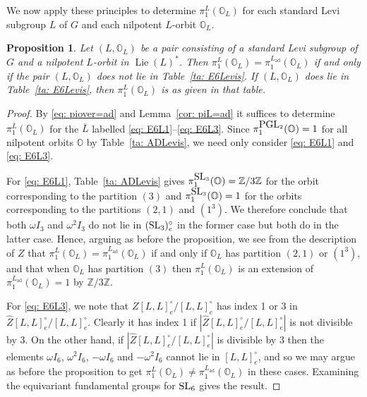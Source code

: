 \documentclass[11pt]{amsart}
\renewcommand{\O}{{\mathbb O}}
\newcommand{\bZ}{{\mathbb Z}}
\newcommand{\ad}{{\operatorname{ad}}}
\newcommand{\Lie}{\operatorname{Lie}}
\newcommand{\SL}{{{\mbox{\rm SL}}}}
\newcommand{\PGL}{{{\mbox{\rm PGL}}}}
\newtheorem{prop}[theorem]{Proposition}
\numberwithin{equation}{section}
\begin{document}
	We now apply these principles to determine $\pi_1^L(\O_L)$ for each standard Levi subgroup $L$ of $G$ and each nilpotent $L$-orbit $\O_L$.
	
	\begin{prop}\label{prop: E6 Levi Gps}
		Let $(L,\O_L)$ be a pair consisting of a standard Levi subgroup of $G$ and a nilpotent $L$-orbit in $\Lie(L)^*$. Then $\pi_1^{L}(\O_L)=\pi_1^{L_\ad}(\O_L)$ if and only if the pair $(L,\O_L)$ does not lie in Table~\ref{ta: E6Levis}. If $(L,\O_L)$ does lie in Table~\ref{ta: E6Levis}, then $\pi_1^{L}(\O_L)$ is as given in that table.
	\end{prop}
	
	\begin{proof}
		
		By \eqref{eq: piover=ad} and Lemma~\ref{cor: piL=ad} it suffices to determine $\pi_1^{\overline{L}}(\O_L)$ for the $\overline{L}$ labelled \eqref{eq: E6L1}--\eqref{eq: E6L3}. Since $\pi_1^{\tiny \PGL_2}(\O)=1$ for all nilpotent orbits $\O$ by Table~\ref{ta: ADLevis}, we need only consider \eqref{eq: E6L1} and \eqref{eq: E6L3}.
		
		For \eqref{eq: E6L1}, Table~\ref{ta: ADLevis} gives $\pi_1^{\tiny \SL_3}(\O)=\bZ/3\bZ$ for the orbit corresponding to the partition $(3)$ and $\pi_1^{\tiny \SL_3}(\O)=1$ for the orbits corresponding to the partitions $(2,1)$ and $(1^3)$. We therefore conclude that both $\omega I_3$ and $\omega^2 I_3$ do not lie in $(\SL_3)_e^\circ$ in the former case but both do in the latter case. Hence, arguing as before the proposition, we see from the description of $Z$ that $\pi_1^{L}(\O_L)=\pi_1^{L_\ad}(\O_L)$ if and only if $\O_L$ has partition $(2,1)$ or $(1^3)$, and that when $\O_L$ has partition $(3)$ then $\pi_1^{L}(\O_L)$ is an extension of $\pi_1^{L_\ad}(\O_L)=1$ by $\bZ/3\bZ$. 
		
		
		For \eqref{eq: E6L3}, we note that $Z[L,L]_e^\circ /[L,L]_e^\circ$ has index 1 or 3 in $\widehat{Z} [L,L]_e^\circ / [L,L]_e^\circ$. Clearly it has index 1 if $\left\vert \widehat{Z} [L,L]_e^\circ /[L,L]_e^\circ \right\vert$ is not divisible by 3. On the other hand, if $\left\vert \widehat{Z} [L,L]_e^\circ /[L,L]_e^\circ \right\vert$  is divisible by 3 then the elements $\omega I_6$, $\omega^2 I_6$, $-\omega I_6$ and $-\omega^2 I_6$ cannot lie in $[L,L]_e^\circ$, and so we may argue as before the proposition to get $\pi_1^L(\O_L)\neq \pi_1^{L_\ad}(\O_L)$ in these cases. Examining the equivariant fundamental groups for $\SL_6$ gives the result.
	\end{proof}
	
\end{document}
